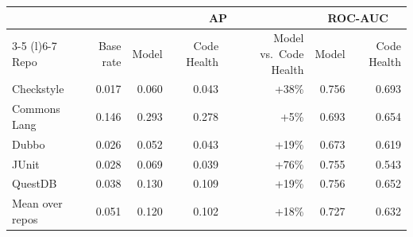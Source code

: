 \begin{tabular}{@{}lrrrrrr@{}}
\toprule
 & & \multicolumn{3}{c}{AP} & \multicolumn{2}{c}{ROC-AUC} \\
\cmidrule(lr){3-5} \cmidrule(l){6-7}
Repo & Base rate & Model & Code Health & Model vs.\ Code Health & Model & Code Health \\
\midrule
Checkstyle & 0.017 & 0.060 & 0.043 & +38\% & 0.756 & 0.693 \\
Commons Lang & 0.146 & 0.293 & 0.278 & +5\% & 0.693 & 0.654 \\
Dubbo & 0.026 & 0.052 & 0.043 & +19\% & 0.673 & 0.619 \\
JUnit & 0.028 & 0.069 & 0.039 & +76\% & 0.755 & 0.543 \\
QuestDB & 0.038 & 0.130 & 0.109 & +19\% & 0.756 & 0.652 \\
\midrule
Mean over repos & 0.051 & 0.120 & 0.102 & +18\% & 0.727 & 0.632 \\
\bottomrule
\end{tabular}
